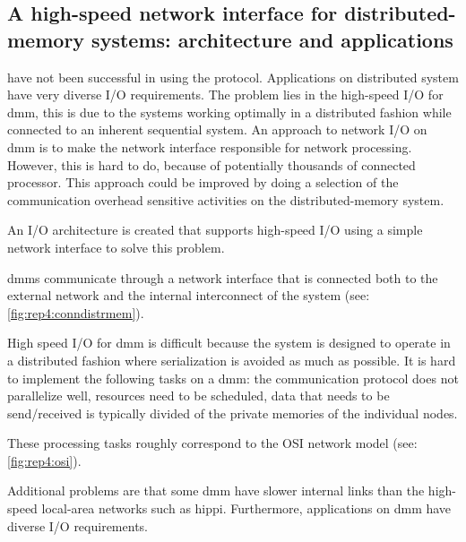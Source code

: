 
\subsection{A high-speed network interface for distributed-memory systems: architecture and applications \cite{steenkiste1997high}} \label{ss:steenkiste1997high}

 have not been successful in using the  protocol.
Applications on distributed system have very diverse I/O requirements.
The problem lies in the high-speed I/O for \ac{dmm}, this is due to the systems working optimally in a distributed fashion while connected to an inherent sequential system.
An approach to network I/O on \ac{dmm} is to make the network interface responsible for network processing.
However, this is hard to do, because of potentially thousands of connected processor.
This approach could be improved by doing a selection of the communication overhead sensitive activities on the distributed-memory system.


\objective
An I/O architecture is created that supports high-speed I/O using a simple network interface to solve this problem.

\summary
\Ac{dmm}s communicate through a network interface that is connected both to the external network and the internal interconnect of the system (see: \cref{fig:rep4:conndistrmem}).

High speed I/O for \ac{dmm} is difficult because the system is designed to operate in a distributed fashion where serialization is avoided as much as possible.
It is hard to implement the following tasks on a \ac{dmm}: the communication protocol does not parallelize well, resources need to be scheduled, data that needs to be send/received is typically divided of the private memories of the individual nodes.

These processing tasks roughly correspond to the OSI network model (see: \cref{fig:rep4:osi}).

Additional problems are that some \acs{dmm} have slower internal links than the high-speed local-area networks such as \ac{hippi}.
Furthermore, applications on \ac{dmm} have diverse I/O requirements.

